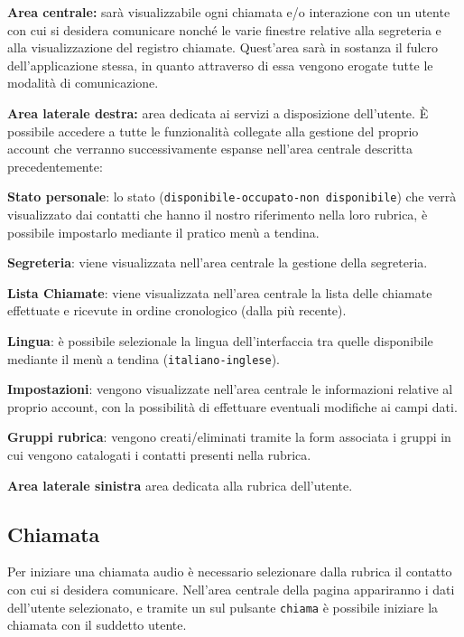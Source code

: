 \begin{description}
\item \textbf{Area centrale:} sarà visualizzabile ogni chiamata e/o interazione con un utente con cui si desidera comunicare nonché le varie finestre relative alla segreteria e alla visualizzazione del registro chiamate. Quest'area sarà in sostanza il fulcro dell'applicazione stessa, in quanto attraverso di essa vengono erogate tutte le modalità di comunicazione.

\item \textbf{Area laterale destra:} area dedicata ai servizi a disposizione dell'utente. È possibile accedere a tutte le funzionalità collegate alla gestione del proprio account che verranno successivamente espanse nell'area centrale descritta precedentemente:
\begin{description}
\item \textbf{Stato personale}: lo stato (\texttt{disponibile-occupato-non disponibile}) che verrà visualizzato dai contatti che hanno il nostro riferimento nella loro rubrica, è possibile impostarlo mediante il pratico menù a tendina.
\item \textbf{Segreteria}: viene visualizzata nell'area centrale la gestione della segreteria.
\item \textbf{Lista Chiamate}: viene visualizzata nell'area centrale la lista delle chiamate effettuate e ricevute in ordine cronologico (dalla più recente).
\item \textbf{Lingua}: è possibile selezionale la lingua dell'interfaccia tra quelle disponibile mediante il menù a tendina (\texttt{italiano-inglese}).
\item \textbf{Impostazioni}: vengono visualizzate nell'area centrale le informazioni relative al proprio account, con la possibilità di effettuare eventuali modifiche ai campi dati.
\item \textbf{Gruppi rubrica}: vengono creati/eliminati tramite la form associata i gruppi in cui vengono catalogati i contatti presenti nella rubrica.
\end{description}
\item \textbf{Area laterale sinistra} area dedicata alla rubrica dell'utente.  
\end{description}

\subsection{Chiamata}
Per iniziare una chiamata audio è necessario selezionare dalla rubrica il contatto con cui si desidera comunicare. Nell'area centrale della pagina appariranno i dati dell'utente selezionato, e tramite un  sul pulsante \texttt{chiama} è possibile iniziare la chiamata con il suddetto utente.

